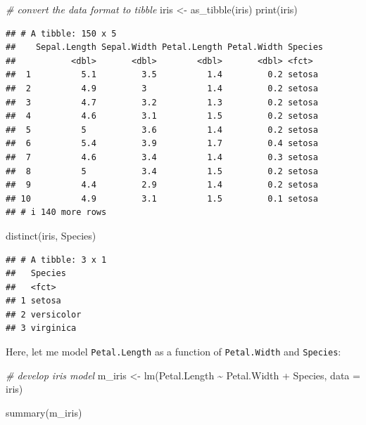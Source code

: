 \documentclass[
]{article}
\newenvironment{Shaded}{\begin{snugshade}}{\end{snugshade}}
\newcommand{\AttributeTok}[1]{\textcolor[rgb]{0.77,0.63,0.00}{#1}}
\newcommand{\CommentTok}[1]{\textcolor[rgb]{0.56,0.35,0.01}{\textit{#1}}}
\newcommand{\FunctionTok}[1]{\textcolor[rgb]{0.00,0.00,0.00}{#1}}
\newcommand{\NormalTok}[1]{#1}
\newcommand{\OtherTok}[1]{\textcolor[rgb]{0.56,0.35,0.01}{#1}}
\newcommand{\SpecialCharTok}[1]{\textcolor[rgb]{0.00,0.00,0.00}{#1}}
\begin{document}
\begin{Shaded}
\begin{Highlighting}[]
\CommentTok{\# convert the data format to tibble}
\NormalTok{iris }\OtherTok{\textless{}{-}} \FunctionTok{as\_tibble}\NormalTok{(iris)}
\FunctionTok{print}\NormalTok{(iris)}
\end{Highlighting}
\end{Shaded}

\begin{verbatim}
## # A tibble: 150 x 5
##    Sepal.Length Sepal.Width Petal.Length Petal.Width Species
##           <dbl>       <dbl>        <dbl>       <dbl> <fct>  
##  1          5.1         3.5          1.4         0.2 setosa 
##  2          4.9         3            1.4         0.2 setosa 
##  3          4.7         3.2          1.3         0.2 setosa 
##  4          4.6         3.1          1.5         0.2 setosa 
##  5          5           3.6          1.4         0.2 setosa 
##  6          5.4         3.9          1.7         0.4 setosa 
##  7          4.6         3.4          1.4         0.3 setosa 
##  8          5           3.4          1.5         0.2 setosa 
##  9          4.4         2.9          1.4         0.2 setosa 
## 10          4.9         3.1          1.5         0.1 setosa 
## # i 140 more rows
\end{verbatim}

\begin{Shaded}
\begin{Highlighting}[]
\FunctionTok{distinct}\NormalTok{(iris, Species)}
\end{Highlighting}
\end{Shaded}

\begin{verbatim}
## # A tibble: 3 x 1
##   Species   
##   <fct>     
## 1 setosa    
## 2 versicolor
## 3 virginica
\end{verbatim}

Here, let me model \texttt{Petal.Length} as a function of \texttt{Petal.Width} and \texttt{Species}:

\begin{Shaded}
\begin{Highlighting}[]
\CommentTok{\# develop iris model}
\NormalTok{m\_iris }\OtherTok{\textless{}{-}} \FunctionTok{lm}\NormalTok{(Petal.Length }\SpecialCharTok{\textasciitilde{}}\NormalTok{ Petal.Width }\SpecialCharTok{+}\NormalTok{ Species,}
             \AttributeTok{data =}\NormalTok{ iris)}

\FunctionTok{summary}\NormalTok{(m\_iris)}
\end{Highlighting}
\end{Shaded}
\end{document}

